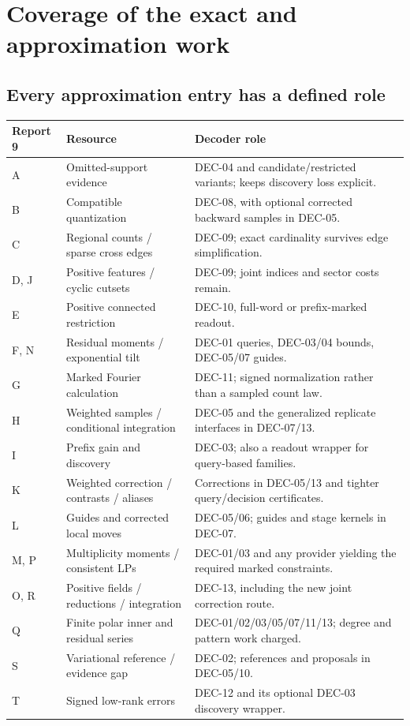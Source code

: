 \documentclass[10pt,a4paper]{article}
\begin{document}
\clearpage
\section{Coverage of the exact and approximation work}
\label{sec:coverage}
\subsection{Every approximation entry has a defined role}
\begin{center}\small
\begin{tabularx}{\textwidth}{@{}p{}p{}Y@{}}\toprule
Report 9 & Resource & Decoder role\\\midrule
A & Omitted-support evidence & DEC-04 and candidate/restricted variants; keeps discovery loss explicit.\\
B & Compatible quantization & DEC-08, with optional corrected backward samples in DEC-05.\\
C & Regional counts / sparse cross edges & DEC-09; exact cardinality survives edge simplification.\\
D, J & Positive features / cyclic cutsets & DEC-09; joint indices and sector costs remain.\\
E & Positive connected restriction & DEC-10, full-word or prefix-marked readout.\\
F, N & Residual moments / exponential tilt & DEC-01 queries, DEC-03/04 bounds, DEC-05/07 guides.\\
G & Marked Fourier calculation & DEC-11; signed normalization rather than a sampled count law.\\
H & Weighted samples / conditional integration & DEC-05 and the generalized replicate interfaces in DEC-07/13.\\
I & Prefix gain and discovery & DEC-03; also a readout wrapper for query-based families.\\
K & Weighted correction / contrasts / aliases & Corrections in DEC-05/13 and tighter query/decision certificates.\\
L & Guides and corrected local moves & DEC-05/06; guides and stage kernels in DEC-07.\\
M, P & Multiplicity moments / consistent LPs & DEC-01/03 and any provider yielding the required marked constraints.\\
O, R & Positive fields / reductions / integration & DEC-13, including the new joint correction route.\\
Q & Finite polar inner and residual series & DEC-01/02/03/05/07/11/13; degree and pattern work charged.\\
S & Variational reference / evidence gap & DEC-02; references and proposals in DEC-05/10.\\
T & Signed low-rank errors & DEC-12 and its optional DEC-03 discovery wrapper.\\\bottomrule
\end{tabularx}
\end{center}
\end{document}
